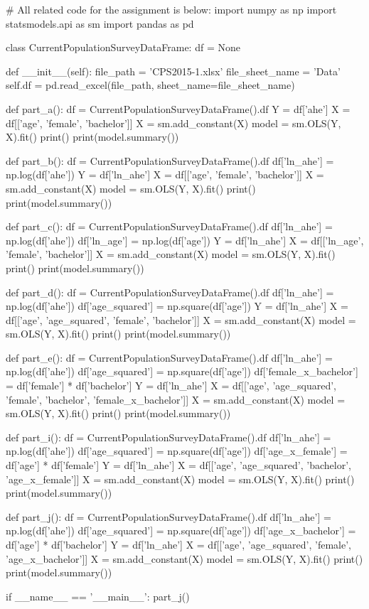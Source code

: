 \documentclass{uofa-eng-assignment}
\begin{document}
\begin{python}
# All related code for the assignment is below:
import numpy as np
import statsmodels.api as sm
import pandas as pd


class CurrentPopulationSurveyDataFrame:
    df = None

    def __init__(self):
        file_path = 'CPS2015-1.xlsx'
        file_sheet_name = 'Data'
        self.df = pd.read_excel(file_path, sheet_name=file_sheet_name)


def part_a():
    df = CurrentPopulationSurveyDataFrame().df
    Y = df['ahe']
    X = df[['age', 'female', 'bachelor']]
    X = sm.add_constant(X)
    model = sm.OLS(Y, X).fit()
    print()
    print(model.summary())


def part_b():
    df = CurrentPopulationSurveyDataFrame().df
    df['ln_ahe'] = np.log(df['ahe'])
    Y = df['ln_ahe']
    X = df[['age', 'female', 'bachelor']]
    X = sm.add_constant(X)
    model = sm.OLS(Y, X).fit()
    print()
    print(model.summary())


def part_c():
    df = CurrentPopulationSurveyDataFrame().df
    df['ln_ahe'] = np.log(df['ahe'])
    df['ln_age'] = np.log(df['age'])
    Y = df['ln_ahe']
    X = df[['ln_age', 'female', 'bachelor']]
    X = sm.add_constant(X)
    model = sm.OLS(Y, X).fit()
    print()
    print(model.summary())


def part_d():
    df = CurrentPopulationSurveyDataFrame().df
    df['ln_ahe'] = np.log(df['ahe'])
    df['age_squared'] = np.square(df['age'])
    Y = df['ln_ahe']
    X = df[['age', 'age_squared', 'female', 'bachelor']]
    X = sm.add_constant(X)
    model = sm.OLS(Y, X).fit()
    print()
    print(model.summary())


def part_e():
    df = CurrentPopulationSurveyDataFrame().df
    df['ln_ahe'] = np.log(df['ahe'])
    df['age_squared'] = np.square(df['age'])
    df['female_x_bachelor'] = df['female'] * df['bachelor']
    Y = df['ln_ahe']
    X = df[['age', 'age_squared', 'female', 'bachelor', 'female_x_bachelor']]
    X = sm.add_constant(X)
    model = sm.OLS(Y, X).fit()
    print()
    print(model.summary())


def part_i():
    df = CurrentPopulationSurveyDataFrame().df
    df['ln_ahe'] = np.log(df['ahe'])
    df['age_squared'] = np.square(df['age'])
    df['age_x_female'] = df['age'] * df['female']
    Y = df['ln_ahe']
    X = df[['age', 'age_squared', 'bachelor', 'age_x_female']]
    X = sm.add_constant(X)
    model = sm.OLS(Y, X).fit()
    print()
    print(model.summary())


def part_j():
    df = CurrentPopulationSurveyDataFrame().df
    df['ln_ahe'] = np.log(df['ahe'])
    df['age_squared'] = np.square(df['age'])
    df['age_x_bachelor'] = df['age'] * df['bachelor']
    Y = df['ln_ahe']
    X = df[['age', 'age_squared', 'female', 'age_x_bachelor']]
    X = sm.add_constant(X)
    model = sm.OLS(Y, X).fit()
    print()
    print(model.summary())


if __name__ == '__main__':
    part_j()

\end{python}
\end{document}
